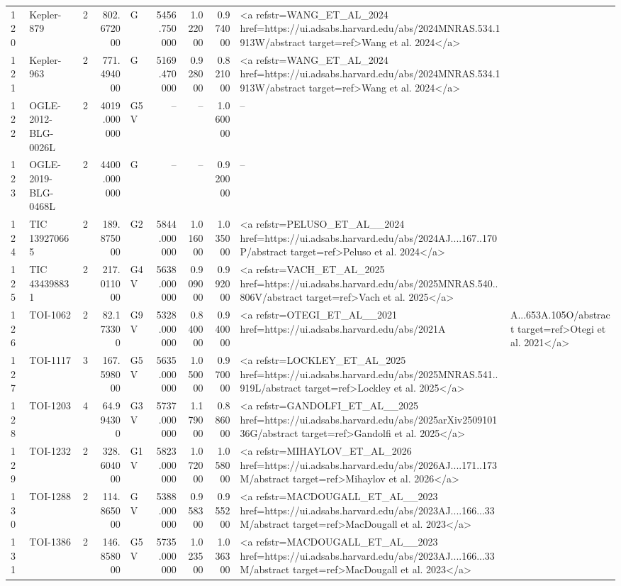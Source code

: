 \begin{tabular}{llrrlrrrl}
120 & Kepler-879 & 2 & 802.672000 & G & 5456.750000 & 1.022000 & 0.974000 & <a refstr=WANG_ET_AL_2024 href=https://ui.adsabs.harvard.edu/abs/2024MNRAS.534.1913W/abstract target=ref>Wang et al. 2024</a> \\
121 & Kepler-963 & 2 & 771.494000 & G & 5169.470000 & 0.928000 & 0.821000 & <a refstr=WANG_ET_AL_2024 href=https://ui.adsabs.harvard.edu/abs/2024MNRAS.534.1913W/abstract target=ref>Wang et al. 2024</a> \\
122 & OGLE-2012-BLG-0026L & 2 & 4019.000000 & G5 V & -- & -- & 1.060000 & -- \\
123 & OGLE-2019-BLG-0468L & 2 & 4400.000000 & G & -- & -- & 0.920000 & -- \\
124 & TIC 139270665 & 2 & 189.875000 & G2 & 5844.000000 & 1.016000 & 1.035000 & <a refstr=PELUSO_ET_AL__2024 href=https://ui.adsabs.harvard.edu/abs/2024AJ....167..170P/abstract target=ref>Peluso et al. 2024</a> \\
125 & TIC 434398831 & 2 & 217.011000 & G4 V & 5638.000000 & 0.909000 & 0.992000 & <a refstr=VACH_ET_AL_2025 href=https://ui.adsabs.harvard.edu/abs/2025MNRAS.540..806V/abstract target=ref>Vach et al. 2025</a> \\
126 & TOI-1062 & 2 & 82.173300 & G9 V & 5328.000000 & 0.840000 & 0.940000 & <a refstr=OTEGI_ET_AL__2021 href=https://ui.adsabs.harvard.edu/abs/2021A&A...653A.105O/abstract target=ref>Otegi et al. 2021</a> \\
127 & TOI-1117 & 3 & 167.598000 & G5 V & 5635.000000 & 1.050000 & 0.970000 & <a refstr=LOCKLEY_ET_AL_2025 href=https://ui.adsabs.harvard.edu/abs/2025MNRAS.541..919L/abstract target=ref>Lockley et al. 2025</a> \\
128 & TOI-1203 & 4 & 64.994300 & G3 V & 5737.000000 & 1.179000 & 0.886000 & <a refstr=GANDOLFI_ET_AL__2025 href=https://ui.adsabs.harvard.edu/abs/2025arXiv250910136G/abstract target=ref>Gandolfi et al. 2025</a> \\
129 & TOI-1232 & 2 & 328.604000 & G1 V & 5823.000000 & 1.072000 & 1.058000 & <a refstr=MIHAYLOV_ET_AL_2026 href=https://ui.adsabs.harvard.edu/abs/2026AJ....171..173M/abstract target=ref>Mihaylov et al. 2026</a> \\
130 & TOI-1288 & 2 & 114.865000 & G V & 5388.000000 & 0.958300 & 0.955200 & <a refstr=MACDOUGALL_ET_AL__2023 href=https://ui.adsabs.harvard.edu/abs/2023AJ....166...33M/abstract target=ref>MacDougall et al. 2023</a> \\
131 & TOI-1386 & 2 & 146.858000 & G5V & 5735.000000 & 1.023500 & 1.036300 & <a refstr=MACDOUGALL_ET_AL__2023 href=https://ui.adsabs.harvard.edu/abs/2023AJ....166...33M/abstract target=ref>MacDougall et al. 2023</a> \\

\end{tabular}
